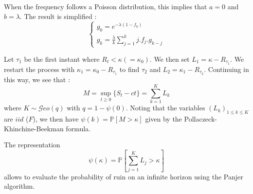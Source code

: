 \begin{f}
	When the frequency follows a Poisson distribution, this implies that {\color{OrangeProfondIRA} $a=0$ and $b=\lambda$.}
	The result is simplified :
	$$
\begin{cases}
		g_0= e^{-\lambda (1-f_0)}
	\\
	g_k=\frac{\lambda}{k}\sum_{j=1}^k j . f_j  . g_{k-j}
\end{cases}	
$$
	
\end{f}

\begin{f}
	
	Let $\tau_1$ be the first instant where $R_t<\kappa(=\kappa_0)$. We then set $L_1=\kappa -R_{\tau_1}$.
	We restart the process with $\kappa_1=\kappa_0-R_{\tau_1}$ to find $\tau_2$ and $L_2=\kappa_1 -R_{\tau_2}$.
	Continuing in this way, we see that :
	$$
	M=\sup_{t\geq 0}\{ S_t -ct \} =\sum_{k=1}^{K}L_k
	$$
	where $K\sim \mathcal{G}eo(q)$ with $q=1-\psi(0)$.  
	Noting that the variables $\left( L_k\right)_{1\leq k\leq K}$ are $iid$ ($F$), we then have $\psi(k)=\mathbb{P}[M>\kappa]$ given by the Pollaczeck-Khinchine-Beekman formula.
	
	
	The representation
	$$
	\psi(\kappa)=\mathbb{P}\left[\sum_{j = 1}^{K}L_j>\kappa \right] 
	$$
	allows to evaluate the probability of ruin on an infinite horizon using the Panjer algorithm.
	
\end{f}





